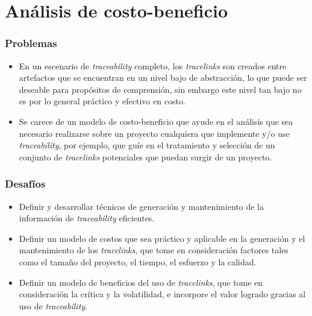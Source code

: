 \documentclass[a4paper,12pt,oneside,spanish]{book}
\begin{document}
\section{Análisis de costo-beneficio}

\subsubsection{Problemas}

\begin{itemize}[label={$\times$}]

\item En un escenario de \textit{traceability} completo, los \textit{tracelinks} son creados entre artefactos que se encuentran en un nivel bajo de abstracción, lo que puede ser deseable para propósitos de comprensión, sin embargo este nivel tan bajo no es por lo general práctico y efectivo en costo.


\item Se carece de un modelo de costo-beneficio que ayude en el análisis que sea necesario realizarse sobre un proyecto cualquiera que implemente y/o use \textit{traceability}, por ejemplo, que guíe en el tratamiento y selección de un conjunto de \textit{tracelinks} potenciales que puedan surgir de un proyecto.

\end{itemize}

\subsubsection{Desafíos}

\begin{itemize}[label={\checkmark}]

\item Definir y desarrollar técnicas de generación y mantenimiento de la información de \textit{traceability} eficientes.

\item Definir un modelo de costos que sea práctico y aplicable en la generación y el mantenimiento de los \textit{tracelinks}, que tome en consideración factores tales como el tamaño del proyecto, el tiempo, el esfuerzo y la calidad.

\item Definir un modelo de beneficios del uso de \textit{tracelinks}, que tome en consideración la crítica y la volatilidad, e incorpore el valor logrado gracias al uso de \textit{traceability}.

\end{itemize}
\end{document}
